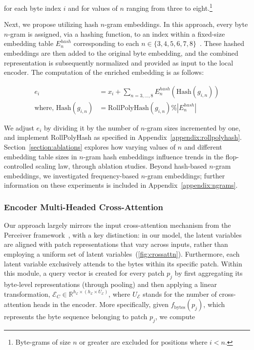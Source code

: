 for each byte index $i$ and for values of $n$ ranging from three to eight.\footnote{
Byte-grams of size $n$ or greater are excluded for positions where $i<n$. }

Next, we propose utilizing hash $n$-gram embeddings. In this approach, every byte $n$-gram is assigned, via a hashing function, to an index within a fixed-size embedding table $E_{n}^{hash}$ corresponding to each $n \in \{3,4,5,6,7,8\}$~\citep{bai2010learning}.
These hashed embeddings are then added to the original byte embedding, and the combined representation is subsequently normalized and provided as input to the local encoder. The computation of the enriched embedding is as follows:

\begin{align}
e_i &= x_i + \sum_{n = 3,...,8}E_{n}^{hash}(\text{Hash}(g_{i,n})) \\
\text{where, Hash}(g_{i,n}) &= \text{RollPolyHash}(g_{i,n}) \% |E_{n}^{hash}|
\end{align}

We adjust $e_i$ by dividing it by the number of $n$-gram sizes incremented by one, and implement RollPolyHash as specified in Appendix~\ref{appendix:rollpolyhash}. Section~\ref{section:ablations} explores how varying values of $n$ and different embedding table sizes in $n$-gram hash embeddings influence trends in the flop-controlled scaling law, through ablation studies. Beyond hash-based $n$-gram embeddings, we investigated frequency-based $n$-gram embeddings; further information on these experiments is included in Appendix~\ref{appendix:ngrams}.

\subsubsection{Encoder Multi-Headed Cross-Attention}
\label{sec:enc-cross-attn}
Our approach largely mirrors the input cross-attention mechanism from the Perceiver framework~\citep{jaegle2021perceiver}, with a key distinction: in our model, the latent variables are aligned with patch representations that vary across inputs, rather than employing a uniform set of latent variables~(\autoref{fig:crossattn}). Furthermore, each latent variable exclusively attends to the bytes within its specific patch. Within this module, a query vector is created for every patch $p_j$ by first aggregating its byte-level representations (through pooling) and then applying a linear transformation, $\mathcal{E}_{C} \in \mathbb{R}^{h_{\mathcal{E}} \times (h_{\mathcal{E}} \times U_{\mathcal{E}})}$, where $U_{\mathcal{E}}$ stands for the number of cross-attention heads in the encoder. More specifically, given $f_{\text{bytes}}(p_j)$, which represents the byte sequence belonging to patch $p_j$, we compute

